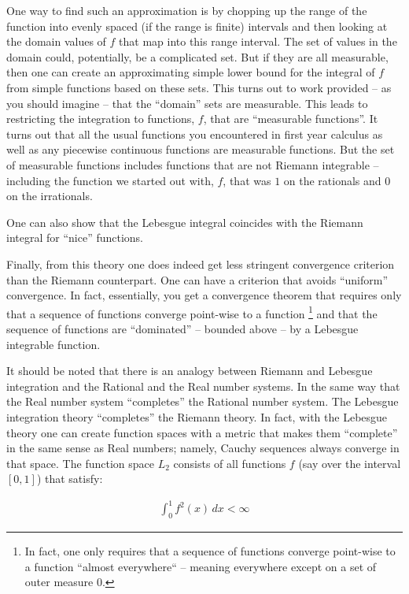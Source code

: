 \documentclass{article}
\begin{document}
One way to find such an approximation is by chopping up the range of the function 
into evenly spaced (if the range is finite) intervals and then looking at the 
domain values of $f$ that map into this range interval. The set of values in 
the domain could, potentially, be a complicated set. But if they are all measurable, then 
one can create an approximating simple lower bound for the integral of $f$ 
from simple functions based on these sets. This turns out to work provided -- 
as you should imagine -- that the ``domain'' sets are measurable. This leads to 
restricting the integration to functions, $f$, that are ``measurable functions''. 
It turns out that all the usual functions you encountered in first year 
calculus as well as any piecewise continuous functions are measurable functions. 
But the set of measurable functions includes functions that are
not Riemann integrable -- including the function we started out with, $f$, that
was $1$ on the rationals and $0$ on the irrationals.

One can also show that the Lebesgue integral coincides with the Riemann integral 
for ``nice'' functions.

Finally, from this theory one does indeed get less stringent convergence 
criterion than the Riemann counterpart. One can have a criterion that avoids ``uniform'' convergence.
In fact, essentially, you get a convergence theorem that requires only that a sequence
of functions converge point-wise to a function%
\footnote{In fact, one only requires that a sequence of functions converge point-wise 
to a function ``almost everywhere`` -- meaning everywhere except on a set of outer measure $0$.}
and that the sequence of functions 
are ``dominated'' -- bounded above -- by a Lebesgue integrable function.

It should be noted that there is an analogy between Riemann and Lebesgue integration 
and the Rational and the Real number systems. In the same way that the Real number 
system ``completes'' the Rational number system. The Lebesgue integration theory ``completes''
the Riemann theory. In fact, with the Lebesgue theory one can create function 
spaces with a metric that makes them ``complete'' in the same sense as Real 
numbers; namely, Cauchy sequences always converge in that space. 
The function space $L_2$ consists of
all functions $f$ (say over the interval $[0,1]$) that satisfy:

\begin{eqnarray}
\int_0^1 f^2(x) \, dx < \infty
\end{eqnarray}
\end{document}
